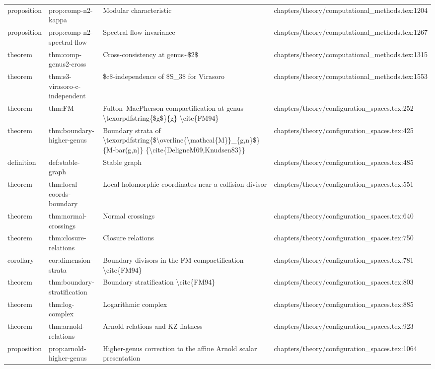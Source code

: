 \documentclass[11pt]{article}
\begin{document}
\begin{longtable}{L{0.10\textwidth}L{0.26\textwidth}L{0.42\textwidth}L{0.22\textwidth}}
proposition & prop:comp-n2-kappa & Modular characteristic & chapters/theory/computational\_methods.tex:1204\\
proposition & prop:comp-n2-spectral-flow & Spectral flow invariance & chapters/theory/computational\_methods.tex:1267\\
theorem & thm:comp-genus2-cross & Cross-consistency at genus\textasciitilde{}\$2\$ & chapters/theory/computational\_methods.tex:1315\\
theorem & thm:s3-virasoro-c-independent & \$c\$-independence of \$S\_3\$ for Virasoro & chapters/theory/computational\_methods.tex:1553\\
theorem & thm:FM & Fulton--MacPherson compactification at genus \textbackslash{}texorpdfstring\{\$g\$\}\{g\} \textbackslash{}cite\{FM94\} & chapters/theory/configuration\_spaces.tex:252\\
theorem & thm:boundary-higher-genus & Boundary strata of \textbackslash{}texorpdfstring\{\$\textbackslash{}overline\{\textbackslash{}mathcal\{M\}\}\_\{g,n\}\$\}\{M-bar(g,n)\} \{\textbackslash{}cite\{DeligneM69,Knudsen83\}\} & chapters/theory/configuration\_spaces.tex:425\\
definition & def:stable-graph & Stable graph & chapters/theory/configuration\_spaces.tex:485\\
theorem & thm:local-coords-boundary & Local holomorphic coordinates near a collision divisor & chapters/theory/configuration\_spaces.tex:551\\
theorem & thm:normal-crossings & Normal crossings & chapters/theory/configuration\_spaces.tex:640\\
theorem & thm:closure-relations & Closure relations & chapters/theory/configuration\_spaces.tex:750\\
corollary & cor:dimension-strata & Boundary divisors in the FM compactification \textbackslash{}cite\{FM94\} & chapters/theory/configuration\_spaces.tex:781\\
theorem & thm:boundary-stratification & Boundary stratification \textbackslash{}cite\{FM94\} & chapters/theory/configuration\_spaces.tex:803\\
theorem & thm:log-complex & Logarithmic complex & chapters/theory/configuration\_spaces.tex:885\\
theorem & thm:arnold-relations & Arnold relations and KZ flatness & chapters/theory/configuration\_spaces.tex:923\\
proposition & prop:arnold-higher-genus & Higher-genus correction to the affine Arnold scalar presentation & chapters/theory/configuration\_spaces.tex:1064\\

\end{longtable}
\end{document}

